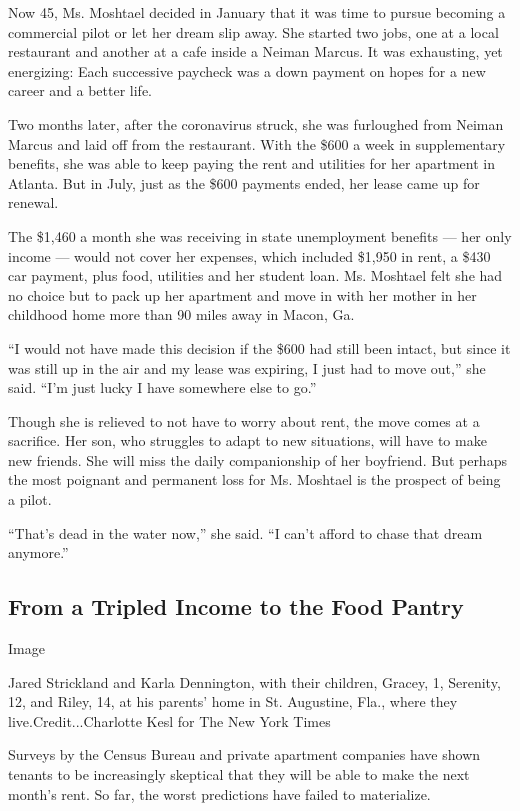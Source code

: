 Now 45, Ms. Moshtael decided in January that it was time to pursue
becoming a commercial pilot or let her dream slip away. She started two
jobs, one at a local restaurant and another at a cafe inside a Neiman
Marcus. It was exhausting, yet energizing: Each successive paycheck was
a down payment on hopes for a new career and a better life.

Two months later, after the coronavirus struck, she was furloughed from
Neiman Marcus and laid off from the restaurant. With the \$600 a week in
supplementary benefits, she was able to keep paying the rent and
utilities for her apartment in Atlanta. But in July, just as the \$600
payments ended, her lease came up for renewal.

The \$1,460 a month she was receiving in state unemployment benefits ---
her only income --- would not cover her expenses, which included \$1,950
in rent, a \$430 car payment, plus food, utilities and her student loan.
Ms. Moshtael felt she had no choice but to pack up her apartment and
move in with her mother in her childhood home more than 90 miles away in
Macon, Ga.

``I would not have made this decision if the \$600 had still been
intact, but since it was still up in the air and my lease was expiring,
I just had to move out,'' she said. ``I'm just lucky I have somewhere
else to go.''

Though she is relieved to not have to worry about rent, the move comes
at a sacrifice. Her son, who struggles to adapt to new situations, will
have to make new friends. She will miss the daily companionship of her
boyfriend. But perhaps the most poignant and permanent loss for Ms.
Moshtael is the prospect of being a pilot.

``That's dead in the water now,'' she said. ``I can't afford to chase
that dream anymore.''

\hypertarget{from-a-tripled-income-to-the-food-pantry}{%
\subsection{From a Tripled Income to the Food
Pantry}\label{from-a-tripled-income-to-the-food-pantry}}

Image

Jared Strickland and Karla Dennington, with their children, Gracey, 1,
Serenity, 12, and Riley, 14, at his parents' home in St. Augustine,
Fla., where they live.Credit...Charlotte Kesl for The New York Times

Surveys by the Census Bureau and private apartment companies have shown
tenants to be increasingly skeptical that they will be able to make the
next month's rent. So far, the worst predictions have failed to
materialize.

